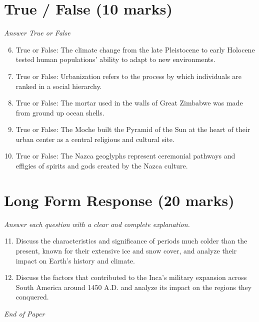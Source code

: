 \documentclass[12pt]{article}
\begin{document}
\section*{True / False (10 marks)}
\textit{Answer True or False}
\begin{enumerate}[label=\arabic*.]
\setcounter{enumi}{5}
\item True or False: The climate change from the late Pleistocene to early Holocene tested human populations' ability to adapt to new environments.
\item True or False: Urbanization refers to the process by which individuals are ranked in a social hierarchy.
\item True or False: The mortar used in the walls of Great Zimbabwe was made from ground up ocean shells.
\item True or False: The Moche built the Pyramid of the Sun at the heart of their urban center as a central religious and cultural site.
\item True or False: The Nazca geoglyphs represent ceremonial pathways and effigies of spirits and gods created by the Nazca culture.
\end{enumerate}

\section*{Long Form Response (20 marks)}
\textit{Answer each question with a clear and complete explanation.}
\begin{enumerate}[label=\arabic*.]
\setcounter{enumi}{10}
\item Discuss the characteristics and significance of periods much colder than the present, known for their extensive ice and snow cover, and analyze their impact on Earth's history and climate.
\item Discuss the factors that contributed to the Inca's military expansion across South America around 1450 A.D. and analyze its impact on the regions they conquered.
\end{enumerate}

\vfill
\noindent\textit{End of Paper}
\end{document}
